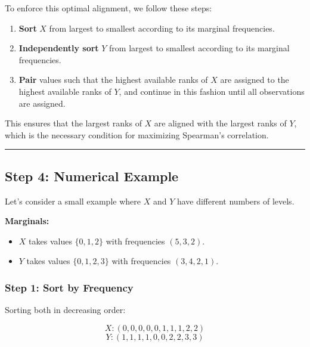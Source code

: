 \documentclass[
  12pt,
  letterpaper,
  DIV=11,
  numbers=noendperiod]{scrartcl}
\providecommand{\tightlist}{%
  \setlength{\itemsep}{0pt}\setlength{\parskip}{0pt}}\usepackage{longtable,booktabs,array}
\begin{document}
To enforce this optimal alignment, we follow these steps:

\begin{enumerate}
\def\labelenumi{\arabic{enumi}.}
\tightlist
\item
  \textbf{Sort} \(X\) from largest to smallest according to its marginal
  frequencies.
\item
  \textbf{Independently sort} \(Y\) from largest to smallest according
  to its marginal frequencies.
\item
  \textbf{Pair} values such that the highest available ranks of \(X\)
  are assigned to the highest available ranks of \(Y\), and continue in
  this fashion until all observations are assigned.
\end{enumerate}

This ensures that the largest ranks of \(X\) are aligned with the
largest ranks of \(Y\), which is the necessary condition for maximizing
Spearman's correlation.

\begin{center}\rule{0.5\linewidth}{0.5pt}\end{center}

\subsection{\texorpdfstring{\textbf{Step 4: Numerical
Example}}{Step 4: Numerical Example}}\label{step-4-numerical-example}

Let's consider a small example where \(X\) and \(Y\) have different
numbers of levels.

\textbf{Marginals:}

\begin{itemize}
\tightlist
\item
  \(X\) takes values \(\{0,1,2\}\) with frequencies \((5,3,2)\).
\item
  \(Y\) takes values \(\{0,1,2,3\}\) with frequencies \((3,4,2,1)\).
\end{itemize}

\subsubsection{\texorpdfstring{\textbf{Step 1: Sort by
Frequency}}{Step 1: Sort by Frequency}}\label{step-1-sort-by-frequency}

Sorting both in decreasing order:

\[X: (0,0,0,0,0,1,1,1,2,2)\] \[Y: (1,1,1,1,0,0,2,2,3,3)\]
\end{document}
